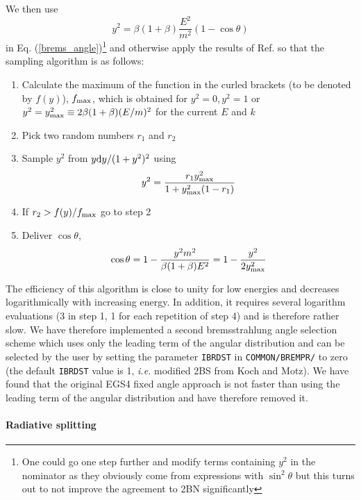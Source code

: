 We then use 
\begin{equation}
y^2 = \beta (1 + \beta) \frac{E^2}{m^2} (1 - \cos \theta)
\end{equation}
in Eq. (\ref{brems_angle})\footnote{One could go one step 
further and modify terms containing $y^2$ in the nominator 
as they obviously come from expressions with $\sin^2 \theta$ but 
this turns out to not improve the agreement to 2BN significantly}  
and otherwise apply the results of 
Ref. \cite{Bi89} so that the sampling algorithm is as follows:
\begin{enumerate}
\item
Calculate the maximum of the function in the curled brackets (to be 
denoted by $f(y)$), 
$f_{\rm max}$,  
which is obtained for $y^2 = 0, y^2 = 1$ or $y^2 = y_{\rm max}^2 \equiv 
2 \beta (1 + \beta) (E/m)^2$ for the current $E$ and $k$
\item
Pick two random numbers $r_1$ and $r_2$
\item
Sample $y^2$ from $y {\rm d}y/(1+y^2)^2$ using 
\begin{equation}
y^2 = {r_1 y_{\rm max}^2 \over 1 + y_{\rm max}^2 (1 - r_1)}
\end{equation}
\item
If $r_2 > f(y)/f_{\rm max}$ go to step 2
\item
Deliver $\cos \theta$, 
\begin{equation}
\cos \theta = 1 - {y^2 m^2 \over \beta (1 + \beta) E^2}
= 1 - \frac{y^2}{2 y_{\rm max}^2}
\end{equation}
\end{enumerate}
The efficiency of this algorithm is close to unity for low 
energies and decreases logarithmically with increasing energy. 
In addition, it requires several logarithm evaluations 
(3 in step 1, 1 for each repetition of step 4) and is therefore 
rather slow. We have therefore implemented a second bremsstrahlung 
angle selection scheme which uses only the leading term of 
the angular distribution and can be selected by the user 
by setting the parameter {\tt IBRDST} in {\tt COMMON/BREMPR/} to zero
(the default {\tt IBRDST} value is 1, 
{\em i.e.} modified 2BS from Koch and Motz). 
We have found that the original 
EGS4 fixed angle approach is not faster than using the 
leading term of the angular distribution and have 
therefore removed it.

\paragraph{Radiative splitting} \hfill
\label{rad_split}

